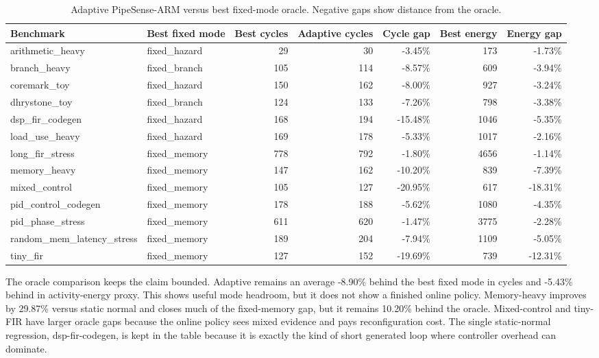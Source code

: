 \documentclass[conference]{IEEEtran}
\newcommand{\pipesense}{PipeSense-ARM}
\begin{document}
\begin{table}[t]
\centering
\caption{Adaptive \pipesense{} versus best fixed-mode oracle. Negative gaps show distance from the oracle.}
\label{tab:oracle}
\small
\begin{tabular}{llrrrrr}
\hline
Benchmark & Best fixed mode & Best cycles & Adaptive cycles & Cycle gap & Best energy & Energy gap \\
\hline
arithmetic\_heavy & fixed\_hazard & 29 & 30 & -3.45\% & 173 & -1.73\% \\
branch\_heavy & fixed\_branch & 105 & 114 & -8.57\% & 609 & -3.94\% \\
coremark\_toy & fixed\_hazard & 150 & 162 & -8.00\% & 927 & -3.24\% \\
dhrystone\_toy & fixed\_branch & 124 & 133 & -7.26\% & 798 & -3.38\% \\
dsp\_fir\_codegen & fixed\_hazard & 168 & 194 & -15.48\% & 1046 & -5.35\% \\
load\_use\_heavy & fixed\_hazard & 169 & 178 & -5.33\% & 1017 & -2.16\% \\
long\_fir\_stress & fixed\_memory & 778 & 792 & -1.80\% & 4656 & -1.14\% \\
memory\_heavy & fixed\_memory & 147 & 162 & -10.20\% & 839 & -7.39\% \\
mixed\_control & fixed\_memory & 105 & 127 & -20.95\% & 617 & -18.31\% \\
pid\_control\_codegen & fixed\_memory & 178 & 188 & -5.62\% & 1080 & -4.35\% \\
pid\_phase\_stress & fixed\_memory & 611 & 620 & -1.47\% & 3775 & -2.28\% \\
random\_mem\_latency\_stress & fixed\_memory & 189 & 204 & -7.94\% & 1109 & -5.05\% \\
tiny\_fir & fixed\_memory & 127 & 152 & -19.69\% & 739 & -12.31\% \\
\hline
\end{tabular}
\end{table}

The oracle comparison keeps the claim bounded. Adaptive remains an average -8.90\% behind the best fixed mode in cycles and -5.43\% behind in activity-energy proxy. This shows useful mode headroom, but it does not show a finished online policy. Memory-heavy improves by 29.87\% versus static normal and closes much of the fixed-memory gap, but it remains 10.20\% behind the oracle. Mixed-control and tiny-FIR have larger oracle gaps because the online policy sees mixed evidence and pays reconfiguration cost. The single static-normal regression, dsp-fir-codegen, is kept in the table because it is exactly the kind of short generated loop where controller overhead can dominate.
\end{document}
